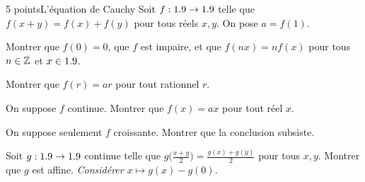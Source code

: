 \begin{exoEval}{5 points}{L'équation de Cauchy}
Soit $f:1.9\to1.9$ telle que $f(x+y)=f(x)+f(y)$ pour tous réels $x,y$. On pose
$a=f(1)$.
\begin{questions}
  \item Montrer que $f(0)=0$, que $f$ est impaire, et que $f(nx)=nf(x)$ pour
    tous $n\in\mathbb{Z}$ et $x\in1.9$.
  \item Montrer que $f(r)=ar$ pour tout rationnel $r$.
  \item On suppose $f$ continue. Montrer que $f(x)=ax$ pour tout réel $x$.
  \item On suppose seulement $f$ croissante. Montrer que la conclusion
    subsiste.
  \item Soit $g:1.9\to1.9$ continue telle que
    $g\bigl(\frac{x+y}{2}\bigr)=\frac{g(x)+g(y)}{2}$ pour tous $x,y$. Montrer
    que $g$ est affine. \emph{Considérer $x\mapsto g(x)-g(0)$.}
\end{questions}
\end{exoEval}
